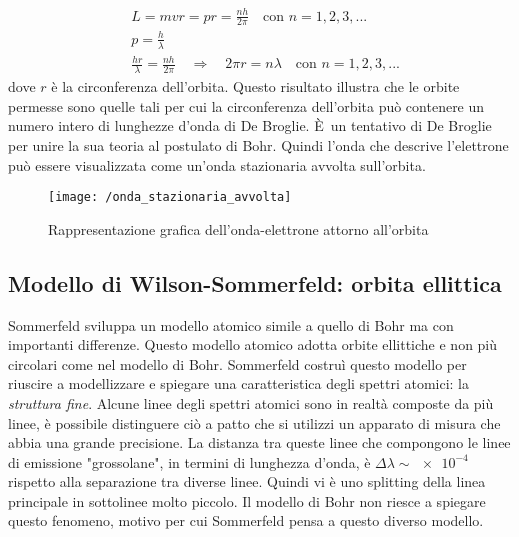 \begin{equation}
\begin{split}
& L = mvr = pr = \frac{ n h }{2 \pi } \quad \mbox{con } n = 1, 2, 3, ... \\
& p = \frac{ h}{\lambda} \\
& \frac{ h r }{\lambda } = \frac{ n h }{2\pi }   \quad\Rightarrow\quad   2\pi r = n \lambda \quad \mbox{con } n = 1, 2, 3, ...
\end{split}
\end{equation}
dove $r$ è la circonferenza dell'orbita.
Questo risultato illustra che le orbite permesse sono quelle tali per cui la circonferenza dell'orbita può contenere un numero intero di lunghezze d'onda di De Broglie.
È un tentativo di De Broglie per unire la sua teoria al postulato di Bohr.
Quindi l'onda che descrive l'elettrone può essere visualizzata come un'onda stazionaria avvolta sull'orbita.
\begin{figure}[h]
\centering
\texttt{[image: /onda\_stazionaria\_avvolta]}
\caption{Rappresentazione grafica dell'onda-elettrone attorno all'orbita}
\end{figure}


\subsection{Modello di Wilson-Sommerfeld: orbita ellittica}
Sommerfeld sviluppa un modello atomico simile a quello di Bohr ma con importanti differenze.
Questo modello atomico adotta orbite ellittiche e non più circolari come nel modello di Bohr.
Sommerfeld costruì questo modello per riuscire a modellizzare e spiegare una caratteristica degli spettri atomici: la \textit{struttura fine}.
Alcune linee degli spettri atomici sono in realtà composte da più linee, è possibile distinguere ciò a patto che si utilizzi un apparato di misura che abbia una grande precisione.
La distanza tra queste linee che compongono le linee di emissione "grossolane", in termini di lunghezza d'onda, è $\Delta \lambda \sim \SI{e-4}{}$ rispetto alla separazione tra diverse linee.
Quindi vi è uno splitting della linea principale in sottolinee molto piccolo.
Il modello di Bohr non riesce a spiegare questo fenomeno, motivo per cui Sommerfeld pensa a questo diverso modello.

